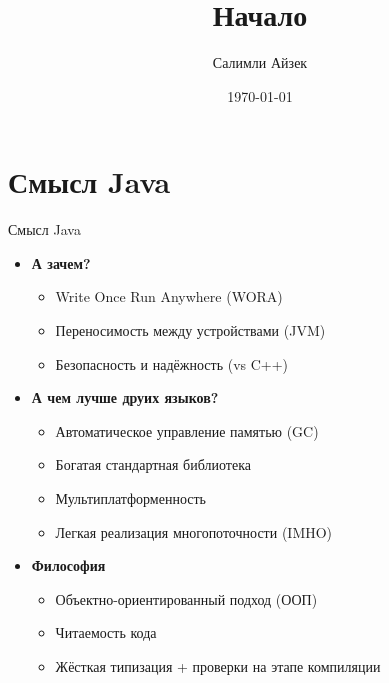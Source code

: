 \documentclass{beamer}
\title[Java Core]{Начало}
\author{Салимли Айзек}
\institute{MathLang}
\date{\today}
\begin{document}
\begin{frame}
    \titlepage
\end{frame}


\section{Смысл Java}
\begin{frame}{Смысл Java}
    \begin{itemize}
        \item \textbf{А зачем?}
        \begin{itemize}
            \item Write Once Run Anywhere (WORA)
            \item Переносимость между устройствами (JVM)
            \item Безопасность и надёжность (vs C++)
        \end{itemize}
        
        \item \textbf{А чем лучше друих языков?}
        \begin{itemize}
            \item Автоматическое управление памятью (GC)
            \item Богатая стандартная библиотека
            \item Мультиплатформенность
            \item Легкая реализация многопоточности (IMHO)
        \end{itemize}
        
        \item \textbf{Философия}
        \begin{itemize}
            \item Объектно-ориентированный подход (ООП)
            \item Читаемость кода
            \item Жёсткая типизация + проверки на этапе компиляции
        \end{itemize}
    \end{itemize}
\end{frame}
\end{document}
